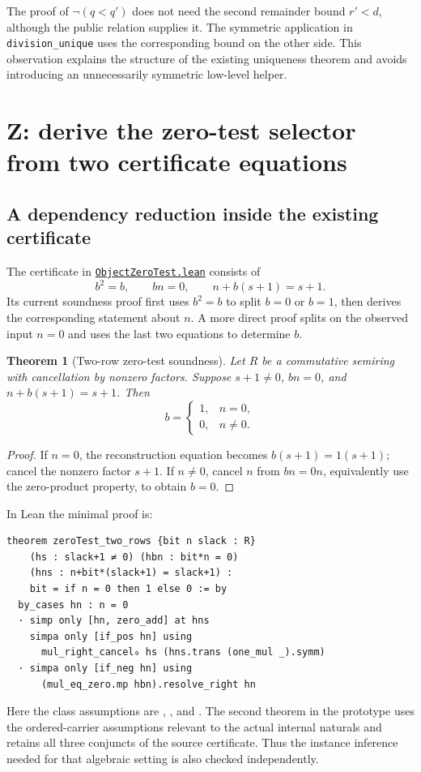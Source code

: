 \documentclass[11pt,letterpaper]{article}
\newcommand{\code}[1]{\nolinkurl{#1}}
\newcommand{\src}[2]{\href{https://github.com/VladimirReshetnikov/ProveIt/blob/9d9d1123b39927d30363f1dcd53c23f0575c30ee/Computability/DiophantineConsistency/Lean/DiophantineConsistency/#1.lean}{\code{#2}}}
\newtheorem{theorem}{Theorem}[section]
\begin{document}
The proof of $\neg(q<q')$ does not need the second remainder bound $r'<d$, although the public relation supplies it. The symmetric application in \code{division_unique} uses the corresponding bound on the other side. This observation explains the structure of the existing uniqueness theorem and avoids introducing an unnecessarily symmetric low-level helper.

\section{Z: derive the zero-test selector from two certificate equations}

\subsection{A dependency reduction inside the existing certificate}

The certificate in \src{ObjectZeroTest}{ObjectZeroTest.lean} consists of
\begin{equation}\label{eq:zerocertificate}
 b^2=b,\qquad bn=0,\qquad n+b(s+1)=s+1.
\end{equation}
Its current soundness proof first uses $b^2=b$ to split $b=0$ or $b=1$, then derives the corresponding statement about $n$. A more direct proof splits on the observed input $n=0$ and uses the last two equations to determine $b$.

\begin{theorem}[Two-row zero-test soundness]
Let $R$ be a commutative semiring with cancellation by nonzero factors. Suppose $s+1\ne0$, $bn=0$, and $n+b(s+1)=s+1$. Then
\[
 b=\begin{cases}1,&n=0,\\0,&n\ne0.\end{cases}
\]
\end{theorem}
\begin{proof}
If $n=0$, the reconstruction equation becomes $b(s+1)=1(s+1)$; cancel the nonzero factor $s+1$. If $n\ne0$, cancel $n$ from $bn=0n$, equivalently use the zero-product property, to obtain $b=0$.
\end{proof}

In Lean the minimal proof is:
\begin{lstlisting}
theorem zeroTest_two_rows {bit n slack : R}
    (hs : slack+1 ≠ 0) (hbn : bit*n = 0)
    (hns : n+bit*(slack+1) = slack+1) :
    bit = if n = 0 then 1 else 0 := by
  by_cases hn : n = 0
  · simp only [hn, zero_add] at hns
    simpa only [if_pos hn] using
      mul_right_cancel₀ hs (hns.trans (one_mul _).symm)
  · simpa only [if_neg hn] using
      (mul_eq_zero.mp hbn).resolve_right hn
\end{lstlisting}
Here the class assumptions are \texttt{}, \texttt{}, and \texttt{}. The second theorem in the prototype uses the ordered-carrier assumptions relevant to the actual internal naturals and retains all three conjuncts of the source certificate. Thus the instance inference needed for that algebraic setting is also checked independently.
\end{document}
